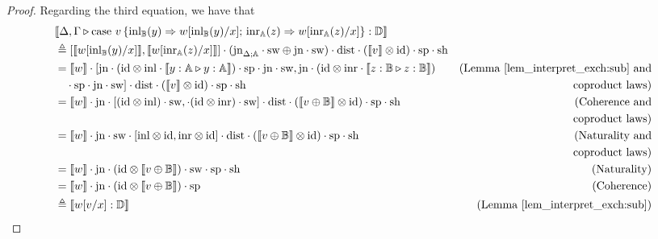 \documentclass[a4paper,UKenglish,cleveref, autoref, thm-restate]{lipics-v2021}
\begin{document}
\begin{proof}
Regarding the third equation, we have that
\begin{align*}
  & \llbracket \Delta,\Gamma \triangleright \text{case } v\, \{\text{inl}_{\mathbb{B}} (y) \Rightarrow w [ \text{inl}_{\mathbb{B}}(y)/x] ;\, \text{inr}_{\mathbb{A}} (z) \Rightarrow w [ \text{inr}_{\mathbb{A}}(z)/x]\}: \mathbb{D}\rrbracket \\
  & \triangleq  [\llbracket  w [ \text{inl}_{\mathbb{B}}(y)/x] \rrbracket, \llbracket  w [ \text{inr}_{\mathbb{A}}(z)/x] \rrbracket] \cdot (\text{jn}_{\Delta;\mathbb{A}} \cdot \mathrm{sw} \oplus \text{jn} \cdot \mathrm{sw}  ) \cdot \mathrm{dist} \cdot (\llbracket v\rrbracket \otimes \text{id}) \cdot  \text{sp} \cdot \text{sh} \\
  & = \llbracket w \rrbracket \cdot [\text{jn} \cdot (\text{id} \otimes\mathrm{inl} \cdot  \llbracket y:\mathbb{A} \triangleright y:\mathbb{A}  \rrbracket) \cdot \text{sp} \cdot \text{jn} \cdot \mathrm{sw} , 
   \text{jn}\cdot (\text{id} \otimes\mathrm{inr}  \cdot \llbracket z:\mathbb{B} \triangleright z:\mathbb{B}  \rrbracket)   & {\text{(Lemma \ref{lem_interpret_exch:sub} and}} \\
  &  \hspace{10pt}\cdot \text{sp} \cdot \text{jn} \cdot \mathrm{sw}  ] \cdot \mathrm{dist} \cdot (\llbracket v\rrbracket \otimes \text{id}) \cdot  \text{sp} \cdot \text{sh} & {\text{coproduct laws)}}  \\
  & =  \llbracket w \rrbracket \cdot \text{jn} \cdot [ (\text{id} \otimes\mathrm{inl})  \cdot \mathrm{sw}  ,     \cdot (\text{id} \otimes\mathrm{inr}) \cdot \mathrm{sw}  ] \cdot \mathrm{dist}  \cdot (\llbracket v \oplus \mathbb{B}\rrbracket \otimes \text{id})  \cdot  \text{sp} \cdot \text{sh}  & {\text{(Coherence and}}   \\
  & \hspace{10pt} & {\text{coproduct laws)}}   \\
  & = \llbracket w \rrbracket \cdot \text{jn} \cdot   \mathrm{sw} \cdot  [\mathrm{inl} \otimes \text{id} , \mathrm{inr} \otimes \text{id}] \cdot \mathrm{dist}   \cdot (\llbracket v \oplus \mathbb{B}\rrbracket \otimes \text{id})  \cdot  \text{sp}\cdot \text{sh}  & {\text{(Naturality and}}  \\
  & \hspace{10pt} & {\text{coproduct laws})}   \\
  & = \llbracket w \rrbracket \cdot \text{jn} \cdot ( \text{id} \otimes \llbracket v \oplus \mathbb{B}\rrbracket )  \cdot  \mathrm{sw}  \cdot  \text{sp} \cdot \text{sh} & {\text{(Naturality)}}\\
  &  = \llbracket w \rrbracket \cdot \text{jn} \cdot ( \text{id} \otimes \llbracket v \oplus \mathbb{B}\rrbracket )  \cdot  \text{sp} & {\text{(Coherence)}}\\
  & \triangleq \llbracket w[v/x] : \mathbb{D} \rrbracket & {\text{(Lemma \ref{lem_interpret_exch:sub})}}
\end{align*}
\end{proof}
\end{document}
